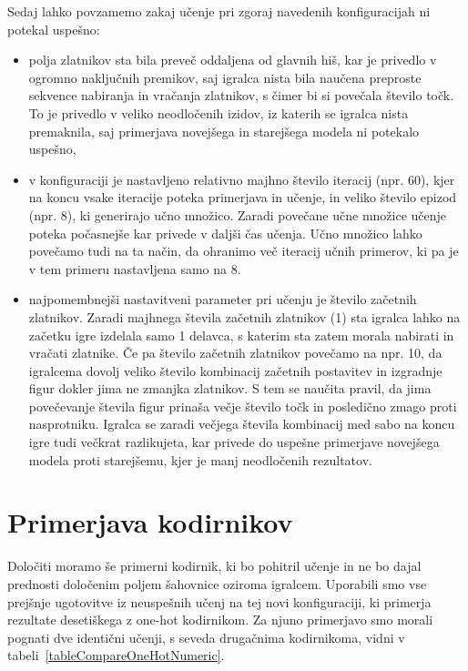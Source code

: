 \documentclass[a4paper, 12pt]{book}
\begin{document}
Sedaj lahko povzamemo zakaj učenje pri zgoraj navedenih konfiguracijah ni potekal uspešno:
\begin{itemize}
	\item polja zlatnikov sta bila preveč oddaljena od glavnih hiš, kar je privedlo v ogromno naključnih premikov, saj igralca nista bila naučena preproste sekvence nabiranja in vračanja zlatnikov, s čimer bi si povečala število točk.
	To je privedlo v veliko neodločenih izidov, iz katerih se igralca nista premaknila, saj primerjava novejšega in starejšega modela ni potekalo uspešno,
	\item v konfiguraciji je nastavljeno relativno majhno število iteracij (npr. 60), kjer na koncu vsake iteracije poteka primerjava in učenje, in veliko število epizod (npr. 8), ki generirajo učno množico.
	Zaradi povečane učne množice učenje poteka počasnejše kar privede v daljši čas učenja. Učno množico lahko povečamo tudi na ta način, da ohranimo več iteracij učnih primerov, ki pa je v tem primeru nastavljena samo na 8.	
	\item najpomembnejši nastavitveni parameter pri učenju je število začetnih zlatnikov.
	Zaradi majhnega števila začetnih zlatnikov (1) sta igralca lahko na začetku igre izdelala samo 1 delavca, s katerim sta zatem morala nabirati in vračati zlatnike.
	Če pa število začetnih zlatnikov povečamo na npr. 10, da igralcema dovolj veliko število kombinacij začetnih postavitev in izgradnje figur dokler jima ne zmanjka zlatnikov.
	S tem se naučita pravil, da jima povečevanje števila figur prinaša večje število točk in posledično zmago proti nasprotniku.
	Igralca se zaradi večjega števila kombinacij med sabo na koncu igre tudi večkrat razlikujeta, kar privede do uspešne primerjave novejšega modela proti starejšemu, kjer je manj neodločenih rezultatov.
	
\end{itemize}

\section{Primerjava kodirnikov}

Določiti moramo še primerni kodirnik, ki bo pohitril učenje in ne bo dajal prednosti določenim poljem šahovnice oziroma igralcem.
Uporabili smo vse prejšnje ugotovitve iz neuspešnih učenj na tej novi konfiguraciji, ki primerja rezultate desetiškega z one-hot kodirnikom.
Za njuno primerjavo smo morali pognati dve identični učenji, s seveda drugačnima kodirnikoma, vidni v tabeli~\ref{tableCompareOneHotNumeric}.
\end{document}
